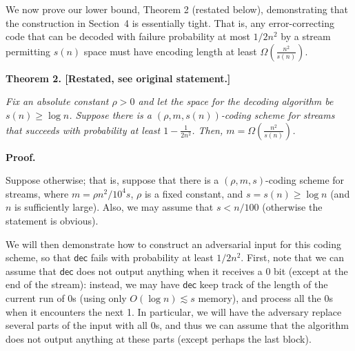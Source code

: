 \documentclass[10pt,a4paper]{article}
\begin{document}
We now prove our lower bound, Theorem 2 (restated below), demonstrating that the construction in Section 4 is essentially tight. That is, any error-correcting code that can be decoded with failure probability at most $1/2n^{2}$ by a stream permitting $s(n)$ space must have encoding length at least $\Omega\left(\frac{n^{2}}{s(n)}\right)$.\par






\par\medskip\noindent\textbf{
\textbf{Theorem 2}\textbf{.}
[Restated, see original statement.]}\par



\emph{Fix an absolute constant $\rho>0$ and let the space for the decoding algorithm be $s(n)\geq\log n$. Suppose there is a $\left(\rho,m,s(n)\right)$-coding scheme for streams that succeeds with probability at least $1-\frac{1}{2n^{2}}$. Then, $m=\Omega\left(\frac{n^{2}}{s(n)}\right)$.}\par







\par\medskip\noindent\textbf{Proof.}\par




Suppose otherwise; that is, suppose that there is a $(\rho,m,s)$-coding scheme for streams, where $m=\rho n^{2}/10^{4}s$, $\rho$ is a fixed constant, and $s=s(n)\geq\log n$ (and $n$ is sufficiently large). Also, we may assume that $s<n/100$ (otherwise the statement is obvious).\par




We will then demonstrate how to construct an adversarial input for this coding scheme, so that $\mathsf{dec}$ fails with probability at least $1/2n^{2}$. First, note that we can assume that $\mathsf{dec}$ does not output anything when it receives a 0 bit (except at the end of the stream): instead, we may have $\mathsf{dec}$ keep track of the length of the current run of 0s (using only $O(\log n)\lesssim s$ memory), and process all the 0s when it encounters the next 1. In particular, we will have the adversary replace several parts of the input with all 0s, and thus we can assume that the algorithm does not output anything at these parts (except perhaps the last block).\par
\end{document}
